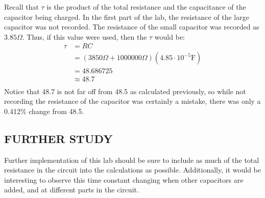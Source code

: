 \documentclass [12pt, letterpaper, twoside] {article}
\begin{document}
Recall that \(\tau\) is the product of the total resistance and the capacitance of the capacitor being charged. In the first part of the lab, the resistance of the large capacitor was not recorded. The resistance of the small capacitor was recorded as \(3.85\Omega\). Thus, if this value were used, then the \(\tau\) would be:
\begin{equation*}
  \begin{split}
    \tau &= RC \\
         &= (3850 \Omega + 1000000\Omega)(4.85\cdot{10}^{-5}\text{F}) \\
         &= 48.686725 \\
         &\approx 48.7 \\
  \end{split}
\end{equation*}
Notice that 48.7 is not far off from 48.5 as calculated previously, so while not recording the resistance of the capacitor was certainly a mistake, there was only a 0.412\% change from 48.5.

\subsection* {FURTHER STUDY}
Further implementation of this lab should be sure to include as much of the total resistance in the circuit into the calculations as possible. Additionally, it would be interesting to observe this time constant changing when other capacitors are added, and at different parts in the circuit.
\end{document}
